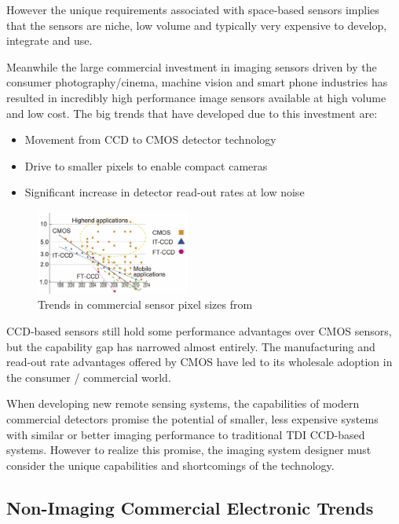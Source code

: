 \documentclass[10pt,journal]{IEEEtran}  %
\begin{document}
However the unique requirements associated with space-based sensors implies that the sensors are niche, low volume and typically very expensive to develop, integrate and use.

Meanwhile the large commercial investment in imaging sensors driven by the consumer photography/cinema, machine vision and smart phone industries has resulted in incredibly high performance image sensors available at high volume and low cost.  The big trends that have developed due to this investment are:

\begin{itemize}
    \item Movement from CCD to CMOS detector technology
    \item Drive to smaller pixels to enable compact cameras
    \item Significant increase in detector read-out rates at low noise
\end{itemize}

\begin{figure}[h!]
\includegraphics[width=0.45\textwidth]{figures/pixel_trend.png}
\caption[]{Trends in commercial sensor pixel sizes from \cite{isscc2016}}
\label{fig:pix_trend}
\end{figure}

CCD-based sensors still hold some performance advantages over CMOS sensors, but the capability gap has narrowed almost entirely. The manufacturing and read-out rate advantages offered by CMOS have led to its wholesale adoption in the consumer / commercial world.

When developing new remote sensing systems, the capabilities of modern commercial detectors promise the potential of smaller, less expensive systems with similar or better imaging performance to traditional TDI CCD-based systems.  However to realize this promise, the imaging system designer must consider the unique capabilities and shortcomings of the technology.

\subsection{Non-Imaging Commercial Electronic Trends}
\end{document}
